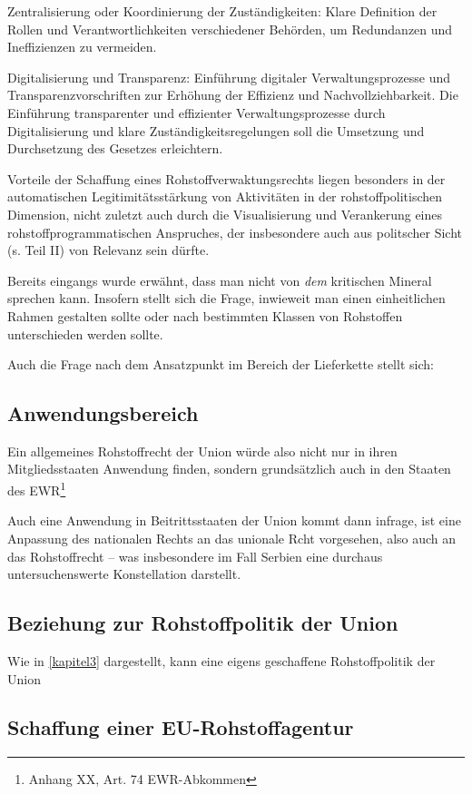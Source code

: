 \documentclass[12pt,a4paper,oneside]{book} %
\begin{document}
Zentralisierung oder Koordinierung der Zuständigkeiten: Klare Definition der Rollen und Verantwortlichkeiten verschiedener Behörden, um Redundanzen und Ineffizienzen zu vermeiden.

Digitalisierung und Transparenz: Einführung digitaler Verwaltungsprozesse und Transparenzvorschriften zur Erhöhung der Effizienz und Nachvollziehbarkeit.
Die Einführung transparenter und effizienter Verwaltungsprozesse durch Digitalisierung und klare Zuständigkeitsregelungen soll die Umsetzung und Durchsetzung des Gesetzes erleichtern.

Vorteile der Schaffung eines Rohstoffverwaktungsrechts liegen besonders in der automatischen Legitimitätsstärkung von Aktivitäten in der rohstoffpolitischen Dimension, nicht zuletzt auch durch die Visualisierung und Verankerung eines rohstoffprogrammatischen Anspruches, der insbesondere auch aus politscher Sicht (s. Teil II) von Relevanz sein dürfte.

Bereits eingangs wurde erwähnt, dass man nicht von \textit{dem} kritischen Mineral sprechen kann. Insofern stellt sich die Frage, inwieweit man einen einheitlichen Rahmen gestalten sollte oder nach bestimmten Klassen von Rohstoffen unterschieden werden sollte.

Auch die Frage nach dem Ansatzpunkt im Bereich der Lieferkette stellt sich:

\subsection{Anwendungsbereich}

Ein allgemeines Rohstoffrecht der Union würde also nicht nur in ihren Mitgliedsstaaten Anwendung finden, sondern grundsätzlich auch in den Staaten des EWR\footnote{Anhang XX, Art. 74 EWR-Abkommen}


Auch eine Anwendung in Beitrittsstaaten der Union kommt dann infrage, ist eine Anpassung des nationalen Rechts an das unionale Rcht vorgesehen, also auch an das Rohstoffrecht -- was insbesondere im Fall Serbien eine durchaus untersuchenswerte Konstellation darstellt.

\subsection{Beziehung zur Rohstoffpolitik der Union}
Wie in \ref{kapitel3} dargestellt, kann eine eigens geschaffene Rohstoffpolitik der Union 

\subsection{Schaffung einer EU-Rohstoffagentur}
\end{document}
